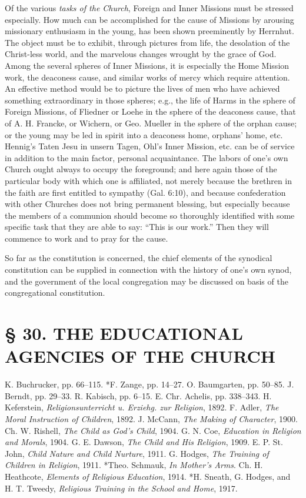 Of the various \emph{tasks of the Church}, Foreign and Inner Missions must be stressed especially. How much can be accomplished for the cause of Missions by arousing missionary enthusiasm in the young, has been shown preeminently by Herrnhut. The object must be to exhibit, through pictures from life, the desolation of the Christ-less world, and the marvelous changes wrought by the grace of God. Among the several spheres of Inner Missions, it is especially the Home Mission work, the deaconess cause, and similar works of mercy which require attention. An effective method would be to picture the lives of men who have achieved something extraordinary in those spheres; e.g., the life of Harms in the sphere of Foreign Missions, of Fliedner or Loehe in the sphere of the deaconess cause, that of A. H. Francke, or Wichern, or Geo. Mueller in the sphere of the orphan cause; or the young may be led in spirit into a deaconess home, orphans’ home, etc. Hennig’s Taten Jesu in unsern Tagen, Ohl’s Inner Mission, etc. can be of service in addition to the main factor, personal acquaintance. The labors of one’s own Church ought always to occupy the foreground; and here again those of the particular body with which one is affiliated, not merely because the brethren in the faith are first entitled to
sympathy (Gal. 6:10), and because confederation with other Churches does not bring permanent blessing, but especially because the members of a communion should become so thoroughly identified with some specific task that they are able to say: “This is our work.” Then they will commence to work and to pray for the cause.

So far as the constitution is concerned, the chief elements of the synodical constitution can be supplied in connection with the history of one’s own synod, and the government of the local congregation may be discussed on basis of the congregational constitution.

\chapter[§ 30. THE EDUCATIONAL AGENCIES]{§ 30. THE EDUCATIONAL AGENCIES OF THE CHURCH}

K. Buchrucker, pp. 66–115. *F. Zange, pp. 14–27. O. Baumgarten, pp. 50–85. J. Berndt, pp. 29–33. R. Kabisch, pp. 6–15. E. Chr. Achelis, pp. 338–343. H. Keferstein, \emph{Religionsunterricht u. Erziehg. zur Religion}, 1892. F. Adler, \emph{The Moral Instruction of Children}, 1892. J. McCann, \emph{The Making of Character}, 1900. Ch. W. Rishell, \emph{The Child as God's Child}, 1904. G. N. Coe, \emph{Education in Religion and Morals}, 1904. G. E. Dawson, \emph{The Child and His Religion}, 1909. E. P. St. John, \emph{Child Nature and Child Nurture}, 1911. G. Hodges, \emph{The Training of Children in Religion}, 1911. *Theo. Schmauk, \emph{In Mother's Arms}. Ch. H. Heathcote, \emph{Elements of Religious Education}, 1914. *H. Sneath, G. Hodges, and H. T. Tweedy, \emph{Religious Training in the School and Home}, 1917.


